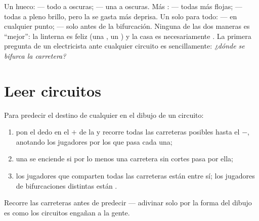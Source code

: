 \begin{remark}\label{rem:g5:series-parallel-circuits:compare}
Un hueco:  --- todo a oscuras;  --- una  a
oscuras. Más :  --- todas más flojas; 
--- todas a pleno brillo, pero la  se gasta más deprisa. Un
solo  para todo:  --- en cualquier punto;  --- solo antes de la bifurcación. Ninguna de las dos maneras
es ``mejor'': la linterna es feliz  (una , un
) y la casa es necesariamente . La primera
pregunta de un electricista ante cualquier circuito es sencillamente:
\emph{¿dónde se bifurca la carretera?}
\end{remark}

\section{Leer circuitos}

\begin{method}\label{met:g5:series-parallel-circuits:follow}
Para predecir el destino de cualquier  en el dibujo de un
circuito:
\begin{enumerate}
  \item pon el dedo en el $+$ de la  y recorre todas las
        carreteras posibles hasta el $-$, anotando los jugadores por
        los que pasa cada una;
  \item una  se enciende si por lo menos una carretera
        sin cortes pasa por ella;
  \item los jugadores que comparten todas las carreteras están
         entre sí; los jugadores de bifurcaciones distintas
        están .
\end{enumerate}
Recorre las carreteras antes de predecir --- adivinar solo por la
forma del dibujo es como los circuitos engañan a la gente.
\end{method}

